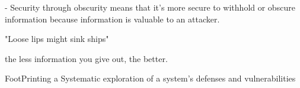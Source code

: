 - Security through obscurity 
  means that it's more secure to withhold or obscure information 
  because information is valuable to an attacker.

"Loose lips might sink ships"

the less information you give out, the better.

FootPrinting 
  a Systematic exploration of a system's defenses and vulnerabilities 